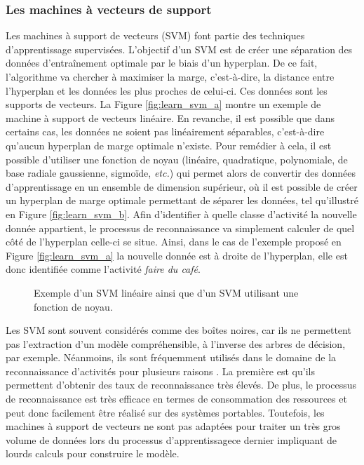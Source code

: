 \subsubsection{Les machines à vecteurs de support}

Les machines à support de vecteurs (\ac{SVM}) font partie des techniques d'apprentissage supervisées. L'objectif d'un \acs{SVM} est de créer une séparation des données d'entraînement optimale par le biais d'un hyperplan. De ce fait, l'algorithme va chercher à maximiser la marge, c'est-à-dire, la distance entre l'hyperplan et les données les plus proches de celui-ci. Ces données sont les supports de vecteurs. La Figure \ref{fig:learn_svm_a} montre un exemple de machine à support de vecteurs linéaire. En revanche, il est possible que dans certains cas, les données ne soient pas linéairement séparables, c'est-à-dire qu'aucun hyperplan de marge optimale n'existe. Pour remédier à cela, il est possible d'utiliser une fonction de noyau (linéaire, quadratique, polynomiale, de base radiale gaussienne, sigmoïde, \textit{etc.}) qui permet alors de convertir des données d'apprentissage en un ensemble de dimension supérieur, où il est possible de créer un hyperplan de marge optimale permettant de séparer les données, tel qu'illustré en Figure \ref{fig:learn_svm_b}. Afin d'identifier à quelle classe d'activité la nouvelle donnée appartient, le processus de reconnaissance va simplement calculer de quel côté de l'hyperplan celle-ci se situe. Ainsi, dans le cas de l'exemple proposé en Figure \ref{fig:learn_svm_a} la nouvelle donnée est à droite de l'hyperplan, elle est donc identifiée comme l'activité \og \textit{faire du café}\fg.

\begin{figure}[H]
	\centering
	\hspace*{\fill}
	\caption{Exemple d'un SVM linéaire ainsi que d'un SVM utilisant une fonction de noyau.}
\end{figure}

Les \acs{SVM} sont souvent considérés comme des boîtes noires, car ils ne permettent pas l'extraction d'un modèle compréhensible, à l'inverse des arbres de décision, par exemple. Néanmoins, ils sont fréquemment utilisés dans le domaine de la reconnaissance d'activités pour plusieurs raisons \citep{He2009, Anguita2012}. La première est qu'ils permettent d'obtenir des taux de reconnaissance très élevés. De plus, le processus de reconnaissance est très efficace en termes de consommation des ressources et peut donc facilement être réalisé sur des systèmes portables. Toutefois, les machines à support de vecteurs ne sont pas adaptées pour traiter un très gros volume de données lors du processus d'apprentissage\textemdash ce dernier impliquant de lourds calculs pour construire le modèle.

